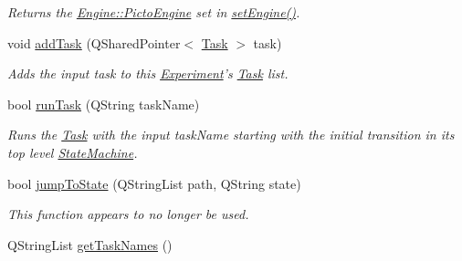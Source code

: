 \begin{DoxyCompactItemize}
\begin{DoxyCompactList}\small\item\em Returns the \hyperlink{class_picto_1_1_engine_1_1_picto_engine}{Engine\-::\-Picto\-Engine} set in \hyperlink{class_picto_1_1_experiment_a567673ce1a500a661712458086612005}{set\-Engine()}. \end{DoxyCompactList}\item 
\hypertarget{class_picto_1_1_experiment_a4d859a7212d947c9f165d5fe9e2ee1ab}{void \hyperlink{class_picto_1_1_experiment_a4d859a7212d947c9f165d5fe9e2ee1ab}{add\-Task} (Q\-Shared\-Pointer$<$ \hyperlink{class_picto_1_1_task}{Task} $>$ task)}\label{class_picto_1_1_experiment_a4d859a7212d947c9f165d5fe9e2ee1ab}

\begin{DoxyCompactList}\small\item\em Adds the input task to this \hyperlink{class_picto_1_1_experiment}{Experiment}'s \hyperlink{class_picto_1_1_task}{Task} list. \end{DoxyCompactList}\item 
bool \hyperlink{class_picto_1_1_experiment_a6cfd77559307223a8121a6a016b489c2}{run\-Task} (Q\-String task\-Name)
\begin{DoxyCompactList}\small\item\em Runs the \hyperlink{class_picto_1_1_task}{Task} with the input task\-Name starting with the initial transition in its top level \hyperlink{class_picto_1_1_state_machine}{State\-Machine}. \end{DoxyCompactList}\item 
bool \hyperlink{class_picto_1_1_experiment_a1e696d6c81bbd72e006185817e01c948}{jump\-To\-State} (Q\-String\-List path, Q\-String state)
\begin{DoxyCompactList}\small\item\em This function appears to no longer be used. \end{DoxyCompactList}\item 
\hypertarget{class_picto_1_1_experiment_a094a9739d52a077a80a67b77f0579ba8}{Q\-String\-List \hyperlink{class_picto_1_1_experiment_a094a9739d52a077a80a67b77f0579ba8}{get\-Task\-Names} ()}\label{class_picto_1_1_experiment_a094a9739d52a077a80a67b77f0579ba8}


\end{DoxyCompactItemize}
